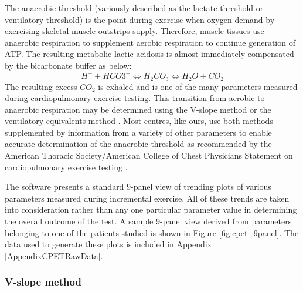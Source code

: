 The anaerobic threshold (variously described as the lactate threshold or ventilatory threshold) is the point during exercise when oxygen demand by exercising skeletal muscle outstrips supply. 
Therefore, muscle tissues use anaerobic respiration to supplement aerobic respiration to continue generation of ATP. 
The resulting metabolic lactic acidosis is almost immediately compensated by the bicarbonate buffer as below: 
\begin{equation} \label{eq:bicarb_buffer}
	H^+ + HCO3^- \Longleftrightarrow H_2CO_3 \Longleftrightarrow H_2O + CO_2
\end{equation}
The resulting excess $CO_2$ is exhaled and is one of the many parameters measured during cardiopulmonary exercise testing. 
This transition from aerobic to anaerobic respiration may be determined using the V-slope method \parencite{sue_metabolic_1988} or the ventilatory equivalents method \parencite{beaver_new_1986}. 
Most centres, like ours, use both methods supplemented by information from a variety of other parameters to enable accurate determination of the anaerobic threshold as recommended by the American Thoracic Society/American College of Chest Physicians Statement on cardiopulmonary exercise testing \parencite{society_ats/accp_2003}.

The software presents a standard 9-panel view of trending plots of various parameters measured during incremental exercise. 
All of these trends are taken into consideration rather than any one particular parameter value in determining the overall outcome of the test. 
A sample 9-panel view derived from parameters belonging to one of the patients studied is shown in Figure \ref{fig:cpet_9panel}. 
The data used to generate these plots is included in Appendix \ref{AppendixCPETRawData}. 

\subsubsection{V-slope method}

